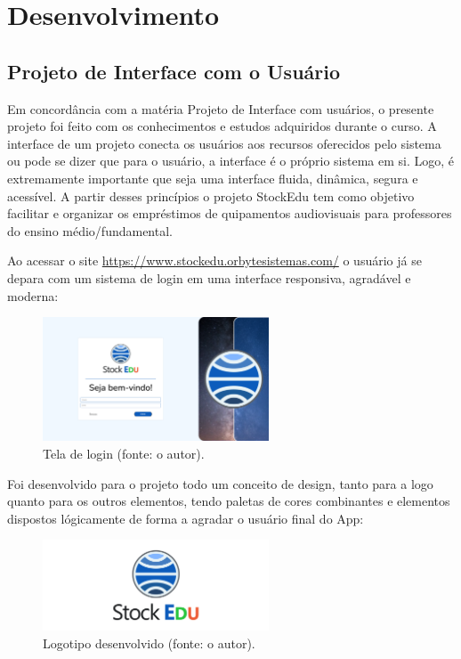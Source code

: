 \documentclass[
	12pt,				%
	openright,			%
	twoside,			%
	a4paper,			%
	english,			%
	french,				%
	spanish,			%
	brazil				%
	]{abntex2}
\begin{document}
\part{Desenvolvimento}

\chapter{Projeto de Interface com o Usuário}
Em concordância com a matéria Projeto de Interface com usuários, o presente
projeto foi feito com os conhecimentos e estudos adquiridos durante o curso. A
interface de um projeto conecta os usuários aos recursos oferecidos pelo sistema
ou pode se dizer que para o usuário, a interface é o próprio sistema em si. Logo, é
extremamente importante que seja uma interface fluida, dinâmica, segura e
acessível. A partir desses princípios o projeto StockEdu tem como objetivo facilitar e
organizar os empréstimos de quipamentos audiovisuais para professores do ensino
médio/fundamental.

Ao acessar o site \url{https://www.stockedu.orbytesistemas.com/} o usuário já se depara com um sistema de login em uma interface responsiva, agradável e moderna:

\begin{figure}[htb]
	\centering
	\includegraphics[width=0.6\textwidth]{fig/print1-login.png}
	\caption{Tela de login (fonte: o autor).}
	\label{fig:print1-login}
\end{figure}

Foi desenvolvido para o projeto todo um conceito de design, tanto para a logo quanto para os outros elementos, tendo paletas de cores combinantes e elementos dispostos lógicamente de forma a agradar o usuário final do App:

\begin{figure}[htb]
	\centering
	\includegraphics[width=0.6\textwidth]{fig/Logo-do-projeto.png}
	\caption{Logotipo desenvolvido (fonte: o autor).}
	\label{fig:Logo-do-projeto}
\end{figure}
\end{document}
